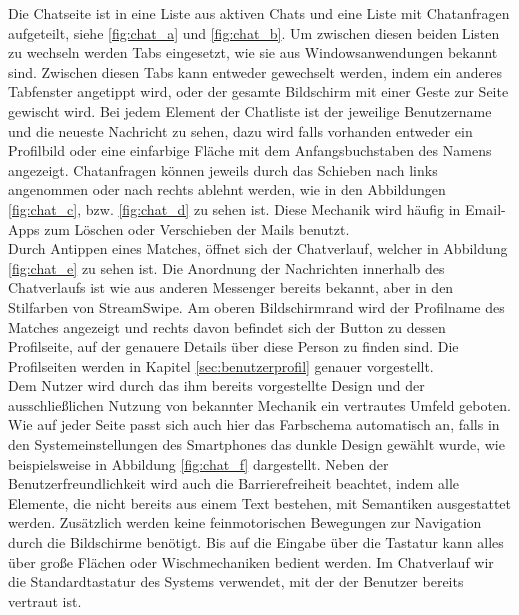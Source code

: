 Die Chatseite ist in eine Liste aus aktiven Chats und eine Liste mit Chatanfragen aufgeteilt, siehe \ref{fig:chat_a} und \ref{fig:chat_b}. Um zwischen diesen beiden Listen zu wechseln werden Tabs eingesetzt, wie sie aus Windowsanwendungen bekannt sind. Zwischen diesen Tabs kann entweder gewechselt werden, indem ein anderes Tabfenster angetippt wird, oder der gesamte Bildschirm mit einer Geste zur Seite gewischt wird. Bei jedem Element der Chatliste ist der jeweilige Benutzername und die neueste Nachricht zu sehen, dazu wird falls vorhanden entweder ein Profilbild oder eine einfarbige Fläche mit dem Anfangsbuchstaben des Namens angezeigt. Chatanfragen können jeweils durch das Schieben nach links angenommen oder nach rechts ablehnt werden, wie in den Abbildungen \ref{fig:chat_c}, bzw. \ref{fig:chat_d} zu sehen ist. Diese Mechanik wird häufig in Email-Apps zum Löschen oder Verschieben der Mails benutzt.\\ 
Durch Antippen eines Matches, öffnet sich der Chatverlauf, welcher in Abbildung \ref{fig:chat_e} zu sehen ist. Die Anordnung der Nachrichten innerhalb des Chatverlaufs ist wie aus anderen Messenger bereits bekannt, aber in den Stilfarben von StreamSwipe. Am oberen Bildschirmrand wird der Profilname des Matches angezeigt und rechts davon befindet sich der Button zu dessen Profilseite, auf der genauere Details über diese Person zu finden sind. Die Profilseiten werden in Kapitel \ref{sec:benutzerprofil} genauer vorgestellt. \\
Dem Nutzer wird durch das ihm bereits vorgestellte Design und der ausschließlichen Nutzung von bekannter Mechanik ein vertrautes Umfeld geboten. Wie auf jeder Seite passt sich auch hier das Farbschema automatisch an, falls in den Systemeinstellungen des Smartphones das dunkle Design gewählt wurde, wie beispielsweise in Abbildung \ref{fig:chat_f} dargestellt. Neben der Benutzerfreundlichkeit wird auch die Barrierefreiheit beachtet, indem alle Elemente, die nicht bereits aus einem Text bestehen, mit Semantiken ausgestattet werden. Zusätzlich werden keine feinmotorischen Bewegungen zur Navigation durch die Bildschirme benötigt. Bis auf die Eingabe über die Tastatur kann alles über große Flächen oder Wischmechaniken bedient werden. Im Chatverlauf wir die Standardtastatur des Systems verwendet, mit der der Benutzer bereits vertraut ist. 


